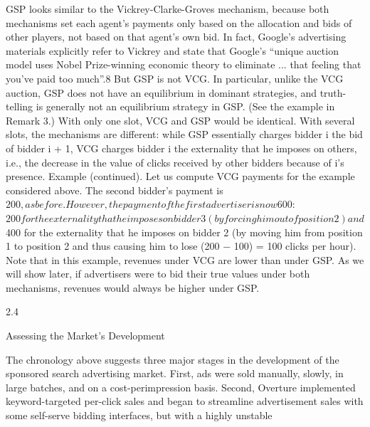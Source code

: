 \documentclass[10pt]{article}
\begin{document}
\begin{ReviewVerbatim}
GSP looks similar to the Vickrey-Clarke-Groves mechanism, because both mechanisms set each
agent’s payments only based on the allocation and bids of other players, not based on that agent’s
own bid. In fact, Google’s advertising materials explicitly refer to Vickrey and state that Google’s
“unique auction model uses Nobel Prize-winning economic theory to eliminate ... that feeling that
you’ve paid too much”.8 But GSP is not VCG. In particular, unlike the VCG auction, GSP does
not have an equilibrium in dominant strategies, and truth-telling is generally not an equilibrium
strategy in GSP. (See the example in Remark 3.) With only one slot, VCG and GSP would be
identical. With several slots, the mechanisms are different: while GSP essentially charges bidder i
the bid of bidder i + 1, VCG charges bidder i the externality that he imposes on others, i.e., the
decrease in the value of clicks received by other bidders because of i’s presence.
Example (continued). Let us compute VCG payments for the example considered above.
The second bidder’s payment is $200, as before. However, the payment of the first advertiser is now
$600: $200 for the externality that he imposes on bidder 3 (by forcing him out of position 2) and
$400 for the externality that he imposes on bidder 2 (by moving him from position 1 to position
2 and thus causing him to lose (200 − 100) = 100 clicks per hour). Note that in this example,
revenues under VCG are lower than under GSP. As we will show later, if advertisers were to bid
their true values under both mechanisms, revenues would always be higher under GSP.

2.4

Assessing the Market’s Development

The chronology above suggests three major stages in the development of the sponsored search
advertising market. First, ads were sold manually, slowly, in large batches, and on a cost-perimpression basis. Second, Overture implemented keyword-targeted per-click sales and began to
streamline advertisement sales with some self-serve bidding interfaces, but with a highly unstable
\end{ReviewVerbatim}
\end{document}
